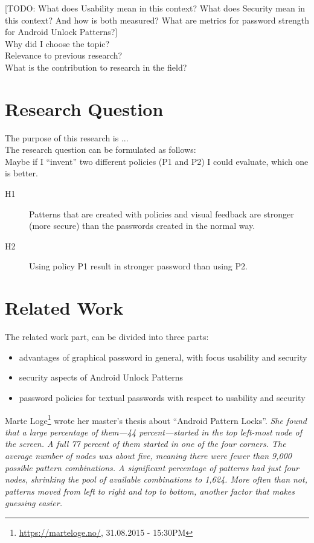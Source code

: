 \documentclass[twocolumn, a4paper, 10pt]{article}
\begin{document}
[TODO: What does Usability mean in this context? What does Security mean in this context? And how is both measured? What are metrics for password strength for Android Unlock Patterns?]\\

Why did I choose the topic?\\
Relevance to previous research?\\
What is the contribution to research in the field?\\

\section{Research Question}
The purpose of this research is ...\\
The research question can be formulated as follows:\\
Maybe if I ``invent'' two different policies (P1 and P2) I could evaluate, which one is better.\\

\begin{description}
  \item[H1]
  Patterns that are created with policies and visual feedback are stronger (more secure) than the passwords created in the normal way.
  \item[H2]
  Using policy P1 result in stronger password than using P2.
\end{description}

\section{Related Work}
The related work part, can be divided into three parts:

\begin{itemize}
  \item advantages of graphical password in general, with focus usability and security
  \item security aspects of Android Unlock Patterns
  \item password policies for textual passwords with respect to usability and security
\end{itemize}

Marte Loge\footnote{\url{https://marteloge.no/}, 31.08.2015 - 15:30PM} wrote her master's thesis about ``Android Pattern Locks''. \emph{She found that a large percentage of them—44 percent—started in the top left-most node of the screen. A full 77 percent of them started in one of the four corners. The average number of nodes was about five, meaning there were fewer than 9,000 possible pattern combinations. A significant percentage of patterns had just four nodes, shrinking the pool of available combinations to 1,624. More often than not, patterns moved from left to right and top to bottom, another factor that makes guessing easier.}
\end{document}
